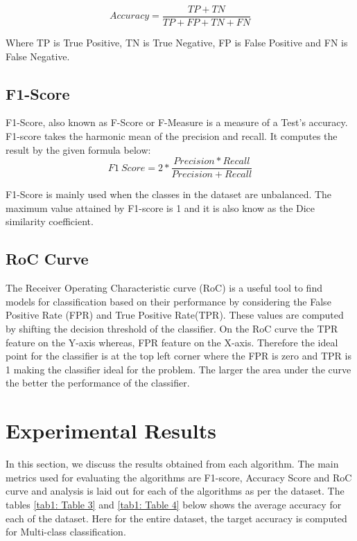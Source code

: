 \documentclass[conference]{IEEEtran}
\begin{document}
\begin{equation}
    Accuracy = \frac{TP + TN}{TP + FP + TN + FN} 
    \label{eq:02}
\end{equation}

Where TP is True Positive, TN is True Negative, FP is False Positive and FN is False Negative.

\subsection{F1-Score}
F1-Score, also known as F-Score or F-Measure is a measure of a Test's accuracy. F1-score takes the harmonic mean of the precision and recall. It computes the result by the given formula below: 
\begin{equation}
    F1\ Score = 2 * \frac{Precision * Recall}{Precision + Recall}
    \label{eq:01}
\end{equation}

F1-Score is mainly used when the classes in the dataset are unbalanced. The maximum value attained by F1-score is 1 and it is also know as the Dice similarity coefficient.

\subsection{RoC Curve}
The Receiver Operating Characteristic curve (RoC) is a useful tool to find models for classification based on their performance by considering the False Positive Rate (FPR) and True Positive Rate(TPR). These values are computed by shifting the decision threshold of the classifier. On the RoC curve the TPR feature on the Y-axis whereas, FPR feature on the X-axis. Therefore the ideal point for the classifier is at the top left corner where the FPR is zero and TPR is 1 making the classifier ideal for the problem. The larger the area under the curve the better the performance of the classifier.     

\section{Experimental Results}

In this section, we discuss the results obtained from each algorithm. The main metrics used for evaluating the algorithms are F1-score, Accuracy Score and RoC curve and analysis is laid out for each of the algorithms as per the dataset. The tables \ref{tab1: Table 3} and \ref{tab1: Table 4} below shows the average accuracy for each of the dataset. Here for the entire dataset, the target accuracy is computed for Multi-class classification.  
\end{document}
